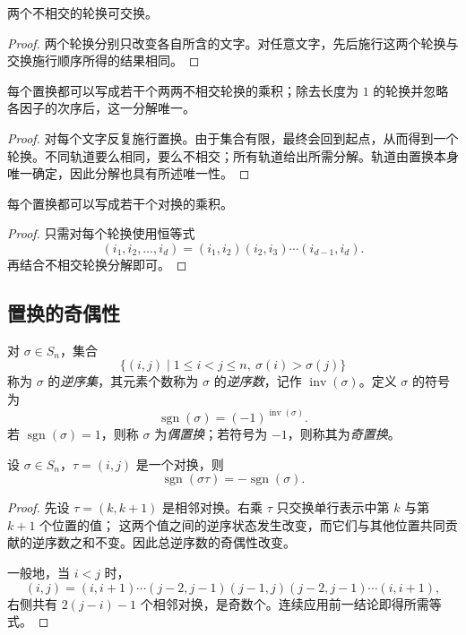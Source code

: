\begin{proposition}
两个不相交的轮换可交换。
\end{proposition}

\begin{proof}
两个轮换分别只改变各自所含的文字。对任意文字，先后施行这两个轮换与交换施行顺序所得的结果相同。
\end{proof}

\begin{proposition}[不相交轮换分解]
每个置换都可以写成若干个两两不相交轮换的乘积；除去长度为 $1$ 的轮换并忽略各因子的次序后，这一分解唯一。
\end{proposition}

\begin{proof}
对每个文字反复施行置换。由于集合有限，最终会回到起点，从而得到一个轮换。不同轨道要么相同，要么不相交；所有轨道给出所需分解。轨道由置换本身唯一确定，因此分解也具有所述唯一性。
\end{proof}

\begin{proposition}[对换分解]
每个置换都可以写成若干个对换的乘积。
\end{proposition}

\begin{proof}
只需对每个轮换使用恒等式
\[
  (i_1,i_2,\dots,i_d)
  =(i_1,i_2)(i_2,i_3)\cdots(i_{d-1},i_d).
\]
再结合不相交轮换分解即可。
\end{proof}

\subsection{置换的奇偶性}

\begin{definition}[逆序数与符号]
对 $\sigma\in S_n$，集合
\[
  \{(i,j)\mid 1\leq i<j\leq n,\ \sigma(i)>\sigma(j)\}
\]
称为 $\sigma$ 的\emph{逆序集}，其元素个数称为 $\sigma$ 的\emph{逆序数}，记作
$\operatorname{inv}(\sigma)$。定义 $\sigma$ 的符号为
\[
  \operatorname{sgn}(\sigma)=(-1)^{\operatorname{inv}(\sigma)}.
\]
若 $\operatorname{sgn}(\sigma)=1$，则称 $\sigma$ 为\emph{偶置换}；若符号为 $-1$，则称其为\emph{奇置换}。
\end{definition}

\begin{lemma}
设 $\sigma\in S_n$，$\tau=(i,j)$ 是一个对换，则
\[
  \operatorname{sgn}(\sigma\tau)=-\operatorname{sgn}(\sigma).
\]
\end{lemma}

\begin{proof}
先设 $\tau=(k,k+1)$ 是相邻对换。右乘 $\tau$ 只交换单行表示中第 $k$ 与第 $k+1$ 个位置的值；
这两个值之间的逆序状态发生改变，而它们与其他位置共同贡献的逆序数之和不变。因此总逆序数的奇偶性改变。

一般地，当 $i<j$ 时，
\[
  (i,j)=(i,i+1)\cdots(j-2,j-1)(j-1,j)
  (j-2,j-1)\cdots(i,i+1),
\]
右侧共有 $2(j-i)-1$ 个相邻对换，是奇数个。连续应用前一结论即得所需等式。
\end{proof}

